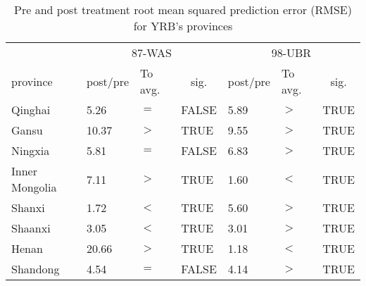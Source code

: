 
\begin{table}[!htbp]\footnotesize
	\centering
	\caption{Pre and post treatment root mean squared prediction error (RMSE) for YRB's provinces}\label{tab:DSC_summary}
	\begin{tabularx}{0.8\textwidth}{XXXXXXX}
	  \toprule
			& \multicolumn{3}{c}{87-WAS} & \multicolumn{3}{c}{98-UBR} \\
  \cmidrule{2-7}    province  & \multicolumn{1}{c}{post/pre} & To avg. & \multicolumn{1}{c}{sig.} & \multicolumn{1}{c}{post/pre} & To avg.   & \multicolumn{1}{c}{sig.} \\
	  \midrule
	  Qinghai & 5.26  & $=$     & FALSE & 5.89  & $>$     & TRUE \\
	  Gansu & 10.37  & $>$     & TRUE  & 9.55  & $>$     & TRUE \\
	  Ningxia & 5.81  & $=$     & FALSE & 6.83  & $>$     & TRUE \\
	  Inner Mongolia & 7.11  & $>$     & TRUE  & 1.60  & $<$     & TRUE \\
	  Shanxi & 1.72  & $<$     & TRUE  & 5.60  & $>$     & TRUE \\
	  Shaanxi & 3.05  & $<$     & TRUE  & 3.01  & $>$     & TRUE \\
	  Henan & 20.66  & $>$     & TRUE  & 1.18  & $<$     & TRUE \\
	  Shandong & 4.54  & $=$     & FALSE & 4.14  & $>$     & TRUE \\
	  \bottomrule
	  \end{tabularx}%
	\label{tab:addlabel}%
\end{table}%
